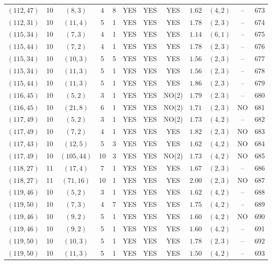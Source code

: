 \begin{longtable}{|c|c|c|c|c|c|c|c|c|c|c|c|}
$(112,47)$ & 10 & $(8,3)$ & 4 & 8 & YES & YES & YES & $1.62$ & $(4,2)$ & -- & 673\\
$(112,31)$ & 10 & $(11,4)$ & 5 & 1 & YES & YES & YES & $1.78$ & $(2,3)$ & -- & 674\\
$(115,34)$ & 10 & $(7,3)$ & 4 & 1 & YES & YES & YES & $1.14$ & $(6,1)$ & -- & 675\\
$(115,44)$ & 10 & $(7,2)$ & 4 & 1 & YES & YES & YES & $1.78$ & $(2,3)$ & -- & 676\\
$(115,34)$ & 10 & $(10,3)$ & 5 & 5 & YES & YES & YES & $1.56$ & $(2,3)$ & -- & 677\\
$(115,34)$ & 10 & $(11,3)$ & 5 & 1 & YES & YES & YES & $1.56$ & $(2,3)$ & -- & 678\\
$(115,44)$ & 10 & $(11,3)$ & 5 & 1 & YES & YES & YES & $1.86$ & $(2,3)$ & -- & 679\\
$(116,45)$ & 10 & $(5,2)$ & 3 & 1 & YES & YES & NO(2) & $1.79$ & $(2,3)$ & -- & 680\\
$(116,45)$ & 10 & $(21,8)$ & 6 & 1 & YES & YES & NO(2) & $1.71$ & $(2,3)$ & NO & 681\\
$(117,49)$ & 10 & $(5,2)$ & 3 & 1 & YES & YES & NO(2) & $1.73$ & $(4,2)$ & -- & 682\\
$(117,49)$ & 10 & $(7,2)$ & 4 & 1 & YES & YES & YES & $1.82$ & $(2,3)$ & NO & 683\\
$(117,43)$ & 10 & $(12,5)$ & 5 & 3 & YES & YES & YES & $1.62$ & $(4,2)$ & NO & 684\\
$(117,49)$ & 10 & $(105,44)$ & 10 & 3 & YES & YES & NO(2) & $1.73$ & $(4,2)$ & NO & 685\\
$(118,27)$ & 11 & $(17,4)$ & 7 & 1 & YES & YES & YES & $1.67$ & $(2,3)$ & -- & 686\\
$(118,27)$ & 11 & $(71,16)$ & 10 & 1 & YES & YES & YES & $2.00$ & $(2,3)$ & NO & 687\\
$(119,46)$ & 10 & $(5,2)$ & 3 & 1 & YES & YES & YES & $1.62$ & $(4,2)$ & -- & 688\\
$(119,50)$ & 10 & $(7,3)$ & 4 & 7 & YES & YES & YES & $1.75$ & $(4,2)$ & -- & 689\\
$(119,46)$ & 10 & $(9,2)$ & 5 & 1 & YES & YES & YES & $1.60$ & $(4,2)$ & NO & 690\\
$(119,46)$ & 10 & $(9,2)$ & 5 & 1 & YES & YES & YES & $1.60$ & $(4,2)$ & -- & 691\\
$(119,50)$ & 10 & $(10,3)$ & 5 & 1 & YES & YES & YES & $1.78$ & $(2,3)$ & -- & 692\\
$(119,50)$ & 10 & $(11,3)$ & 5 & 1 & YES & YES & YES & $1.50$ & $(4,2)$ & -- & 693\\

\end{longtable}
